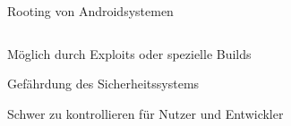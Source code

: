 \begin{frame}
	\centering
	Rooting von Androidsystemen
	\begin{columns}[T] %
    	\begin{column}[T]{5cm} %
    		\begin{block}{}
				Möglich durch Exploits oder spezielle Builds
			\end{block}
			\begin{block}{}
				Gefährdung des Sicherheitssystems
			\end{block}
			\begin{block}{}
				Schwer zu kontrollieren für Nutzer und Entwickler
			\end{block}
    	\end{column}
	\end{columns}

\end{frame}